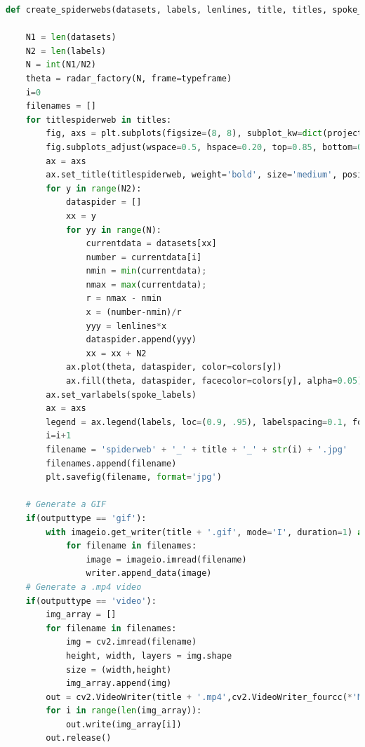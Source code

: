 \clearpage
\begin{lstlisting}[language=Python, caption=Generación de graficos de radar., label=lst:c3]
def create_spiderwebs(datasets, labels, lenlines, title, titles, spoke_labels, colors, typeframe, outputtype):

    N1 = len(datasets)
    N2 = len(labels)
    N = int(N1/N2)
    theta = radar_factory(N, frame=typeframe)
    i=0
    filenames = []
    for titlespiderweb in titles:
        fig, axs = plt.subplots(figsize=(8, 8), subplot_kw=dict(projection='radar'))
        fig.subplots_adjust(wspace=0.5, hspace=0.20, top=0.85, bottom=0.05)
        ax = axs
        ax.set_title(titlespiderweb, weight='bold', size='medium', position=(0.5, 0.5), horizontalalignment='center', verticalalignment='center', fontsize=16)
        for y in range(N2):
            dataspider = []
            xx = y
            for yy in range(N):
                currentdata = datasets[xx]
                number = currentdata[i]
                nmin = min(currentdata);
                nmax = max(currentdata);
                r = nmax - nmin
                x = (number-nmin)/r
                yyy = lenlines*x
                dataspider.append(yyy)
                xx = xx + N2
            ax.plot(theta, dataspider, color=colors[y])
            ax.fill(theta, dataspider, facecolor=colors[y], alpha=0.05)
        ax.set_varlabels(spoke_labels)
        ax = axs
        legend = ax.legend(labels, loc=(0.9, .95), labelspacing=0.1, fontsize='small')
        i=i+1
        filename = 'spiderweb' + '_' + title + '_' + str(i) + '.jpg'
        filenames.append(filename)
        plt.savefig(filename, format='jpg')
    
    # Generate a GIF
    if(outputtype == 'gif'):
        with imageio.get_writer(title + '.gif', mode='I', duration=1) as writer:
            for filename in filenames:
                image = imageio.imread(filename)
                writer.append_data(image)
    # Generate a .mp4 video
    if(outputtype == 'video'):
        img_array = []
        for filename in filenames:
            img = cv2.imread(filename)
            height, width, layers = img.shape
            size = (width,height)
            img_array.append(img)        
        out = cv2.VideoWriter(title + '.mp4',cv2.VideoWriter_fourcc(*'MP4V'), 1, size)
        for i in range(len(img_array)):
            out.write(img_array[i])
        out.release()
\end{lstlisting}

